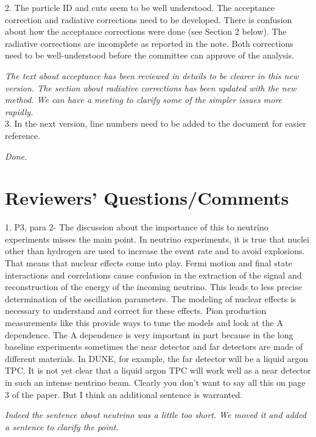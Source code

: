 \documentclass[12pt]{article}
\begin{document}
2.
The particle ID and cuts seem to be well understood.  The acceptance correction and 
radiative corrections need to be developed. There is confusion about how the acceptance 
corrections were done (see Section 2 below). The radiative corrections are incomplete as 
reported in the note.  Both corrections need to be well-understood before the committee can 
approve of the analysis.

{\it The text about acceptance has been reviewed in details to be clearer in this new 
version. The section about radiative corrections has been updated with the new method.
We can have a meeting to clarify some of the simpler issues more rapidly.} \\

3.
In the next version, line numbers need to be added to the document for easier reference.

{\it Done.} \\

\section{Reviewers’ Questions/Comments}
1.
P3, para 2- The discussion about the importance of this to neutrino experiments misses the 
main point.  In neutrino experiments, it is true that nuclei other than hydrogen are used to 
increase the event rate and to avoid explosions.  That means that nuclear effects come into 
play.  Fermi motion and final state interactions and correlations cause confusion in the 
extraction of the signal and reconstruction of the energy of the incoming neutrino.  This 
leads to less precise determination of the oscillation parameters.  The modeling of nuclear 
effects is necessary to understand and correct for these effects.  Pion production 
measurements like this provide ways to tune the models and look at the A dependence.  The 
A dependence is very important in part because in the long baseline experiments sometimes 
the near detector and far detectors are made of different materials.  In DUNE, for example, 
the far detector will be a liquid argon TPC.  It is not yet clear that a liquid argon TPC will 
work well as a near detector in such an intense neutrino beam.  Clearly you don’t want to 
say all this on page 3 of the paper.  But I think an additional sentence is warranted.

{\it Indeed the sentence about neutrino was a little too short. We moved it and added a 
sentence to clarify the point.}\\
\end{document}
